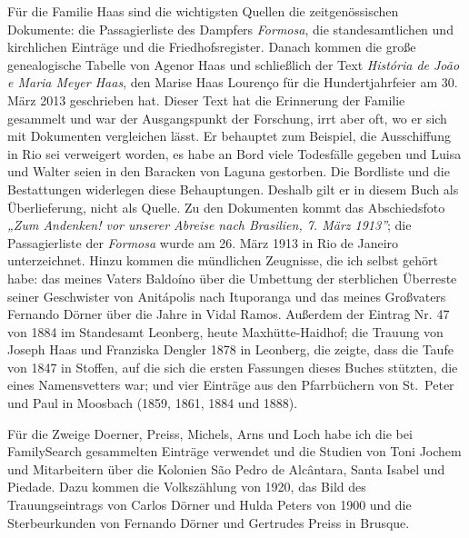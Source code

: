 \documentclass[
  ngerman,
  11pt,
  openany]{book}
\begin{document}
Für die Familie Haas sind die wichtigsten Quellen die zeitgenössischen
Dokumente: die Passagierliste des Dampfers \emph{Formosa}, die
standesamtlichen und kirchlichen Einträge und die Friedhofsregister.
Danach kommen die große genealogische Tabelle von Agenor Haas und
schließlich der Text \emph{História de João e Maria Meyer Haas}, den
Marise Haas Lourenço für die Hundertjahrfeier am 30. März 2013
geschrieben hat. Dieser Text hat die Erinnerung der Familie gesammelt
und war der Ausgangspunkt der Forschung, irrt aber oft, wo er sich mit
Dokumenten vergleichen lässt. Er behauptet zum Beispiel, die
Ausschiffung in Rio sei verweigert worden, es habe an Bord viele
Todesfälle gegeben und Luisa und Walter seien in den Baracken von Laguna
gestorben. Die Bordliste und die Bestattungen widerlegen diese
Behauptungen. Deshalb gilt er in diesem Buch als Überlieferung, nicht
als Quelle. Zu den Dokumenten kommt das Abschiedsfoto \emph{„Zum
Andenken! vor unserer Abreise nach Brasilien, 7. März 1913''}; die
Passagierliste der \emph{Formosa} wurde am 26. März 1913 in Rio de
Janeiro unterzeichnet. Hinzu kommen die mündlichen Zeugnisse, die ich
selbst gehört habe: das meines Vaters Baldoíno über die Umbettung der
sterblichen Überreste seiner Geschwister von Anitápolis nach Ituporanga
und das meines Großvaters Fernando Dörner über die Jahre in Vidal Ramos.
Außerdem der Eintrag Nr. 47 von 1884 im Standesamt Leonberg, heute
Maxhütte-Haidhof; die Trauung von Joseph Haas und Franziska Dengler 1878
in Leonberg, die zeigte, dass die Taufe von 1847 in Stoffen, auf die
sich die ersten Fassungen dieses Buches stützten, die eines
Namensvetters war; und vier Einträge aus den Pfarrbüchern von St.~Peter
und Paul in Moosbach (1859, 1861, 1884 und 1888).

Für die Zweige Doerner, Preiss, Michels, Arns und Loch habe ich die bei
FamilySearch gesammelten Einträge verwendet und die Studien von Toni
Jochem und Mitarbeitern über die Kolonien São Pedro de Alcântara, Santa
Isabel und Piedade. Dazu kommen die Volkszählung von 1920, das Bild des
Trauungseintrags von Carlos Dörner und Hulda Peters von 1900 und die
Sterbeurkunden von Fernando Dörner und Gertrudes Preiss in Brusque.
\end{document}
